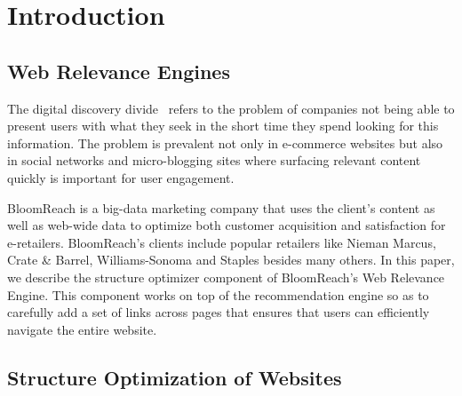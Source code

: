 \section{Introduction}

\subsection{Web Relevance Engines}
The digital discovery divide~\cite{WebRelevanceEngine} refers to the problem of companies not being able to present users with what they seek in the short time they spend looking for this information. The problem is prevalent not only in e-commerce websites but also in social networks and micro-blogging sites where surfacing relevant content quickly is important for user engagement. \vs

BloomReach is a big-data marketing company that uses the client's content as well as web-wide data to optimize both customer acquisition and satisfaction for e-retailers.
BloomReach's clients include popular retailers like Nieman Marcus, Crate \& Barrel, Williams-Sonoma and Staples besides many others. In this paper, we describe the structure optimizer component of BloomReach's Web Relevance Engine. This component works on top of the recommendation engine so as to carefully add a set of links across pages that ensures that users can efficiently navigate the entire website.

\subsection{Structure Optimization of Websites}



